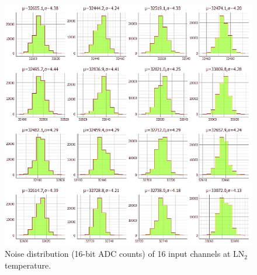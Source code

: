 \begin{figure}[h!]
\centering
  \includegraphics[width=0.8\linewidth]{figures/qc_noisecold.png}
  \caption{Noise distribution (16-bit ADC counts) of 16 input channels at LN$_2$ temperature.}
  \label{fig:qc_noisecold}
\end{figure}

